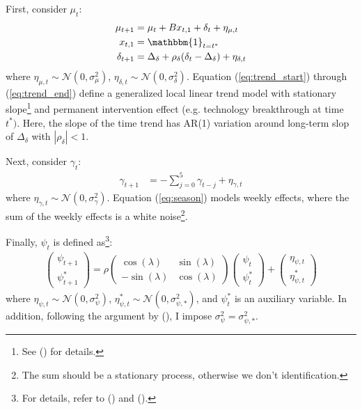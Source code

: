 \documentclass[10pt, titlepage]{article}
\numberwithin{equation}{section}
\begin{document}
First, consider $\mu_t$:
\begin{align}
    \mu_{t+1} &= \mu_t+Bx_{t,1}+\delta_t+\eta_{\mu,t} \label{eq:trend_start} \\
    x_{t,1} &= \mathbbm{1}_{t=t^{*}} \\
    \delta_{t+1} &= \Delta_{\delta} + \rho_{\delta}(\delta_t-\Delta_{\delta}) + \eta_{\delta,t} \label{eq:trend_end} 
\end{align}
where $\eta_{\mu,t}\sim\mathcal{N}(0,\sigma_{\mu}^2)$, $\eta_{\delta,t}\sim\mathcal{N}(0,\sigma_{\delta}^2)$. Equation (\ref{eq:trend_start}) through (\ref{eq:trend_end}) define a generalized local linear trend model with stationary slope\footnote{See (\cite{brodersen_etal_2015}) for details.} and permanent intervention effect (e.g. technology breakthrough at time $t^*)$. Here, the slope of the time trend has AR(1) variation around long-term slop of $\Delta_{\delta}$ with $|\rho_{\delta}|<1$. 

Next, consider $\gamma_t$:
\begin{align}
    \gamma_{t+1}&= -\sum_{j=0}^{5}\gamma_{t-j} + \eta_{\gamma,t} \label{eq:season}
\end{align}
where $\eta_{\gamma,t}\sim\mathcal{N}(0,\sigma_{\gamma}^2)$. Equation (\ref{eq:season}) models weekly effects, where the sum of the weekly effects is a white noise\footnote{The sum should be a stationary process, otherwise we don't identification.}.

Finally, $\psi_t$ is defined as\footnote{For details, refer to (\cite{harvey_1985}) and (\cite{harvey2007trends}).}:
\begin{align}
    \begin{pmatrix}
        \psi_{t+1} \\
        \psi_{t+1}^{*}
    \end{pmatrix}
    =\rho\begin{pmatrix}
        \cos(\lambda) & \sin(\lambda) \\
        -\sin(\lambda) & \cos(\lambda)
    \end{pmatrix}
    \begin{pmatrix}
        \psi_{t} \\
        \psi_{t}^{*}
    \end{pmatrix}
    +\begin{pmatrix}
        \eta_{\psi,t} \\
        \eta_{\psi,t}^{*}
    \end{pmatrix} \label{eq:cycle}
\end{align}
where $\eta_{\psi,t}\sim\mathcal{N}(0,\sigma_{\psi}^2)$, $\eta_{\psi,t}^{*}\sim\mathcal{N}(0,\sigma_{\psi,*}^2)$, and $\psi_{t}^{*}$ is an auxiliary variable. In addition, following the argument by (\cite{harvey_1985}), I impose $\sigma_{\psi}^2=\sigma_{\psi,*}^2$.
\end{document}
